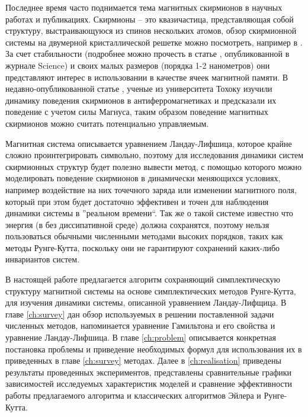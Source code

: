 
Последнее время часто поднимается тема магнитных скирмионов в научных работах и
публикациях. Скирмионы -- это квазичастица, представляющая собой структуру,
выстраивающуюся из спинов нескольких атомов, обзор скирмионной системы на
двумерной кристаллической решетке можно посмотреть, например в \cite{Yu2010}.
За счет стабильности (подробнее можно прочесть в статье \cite{nucleation},
опубликованной в журнале Science) и своих малых размеров (порядка 1-2
нанометров) они представляют интерес в использовании в качестве ячеек магнитной
памяти. В недавно-опубликованной статье \cite{stat-ant-dyn-prop-of-skyr},
ученые из университета Тохоку изучили динамику поведения скирмионов в
антиферромагнетиках и предсказали их поведение с учетом силы Магнуса, таким
образом поведение магнитных скирмионов можно считать потенциально управляемым.

Магнитная система описывается уравнением Ландау-Лифшица, которое крайне сложно
проинтегрировать символьно, поэтому для исследования динамики систем
скирмионных структур будет полезно вывести метод, с помощью которого можно
моделировать поведение скирмионов в динамически меняющихся условиях, например
воздействие на них точечного заряда или изменении магнитного поля, который при
этом будет достаточно эффективен и точен для наблюдения динамики системы в
''реальном времени``. Так же о такой системе известно что энергия (в
без диссипативной среде) должна сохранятся, поэтому нельзя пользоваться
обычными численными методами высоких порядков, таких как методы Рунге-Кутта,
поскольку они не гарантируют сохранений каких-либо инвариантов систем.

\newpage
В настоящей работе предлагается алгоритм сохраняющий симплектическую структуру
магнитной системы на основе симплектических методов Рунге-Кутта, для изучения
динамики системы, описанной уравнением Ландау-Лифщица.  В главе \ref{ch:survey}
дан обзор используемых в решении поставленной задачи численных методов,
напоминается уравнение Гамильтона и его свойства и уравнение Ландау-Лифшица.  В
главе \ref{ch:problem} описывается конкретная постановка проблемы и приведение
необходимых формул для использования их в приведенных в главе \ref{ch:survey}
методах.  Далее в \ref{ch:realisation} приведены результаты проведенных
экспериментов, представлены сравнительные графики зависимостей исследуемых
характеристик моделей и сравнение эффективности работы предлагаемого алгоритма
и классических алгоритмов Эйлера и Рунге-Кутта.
